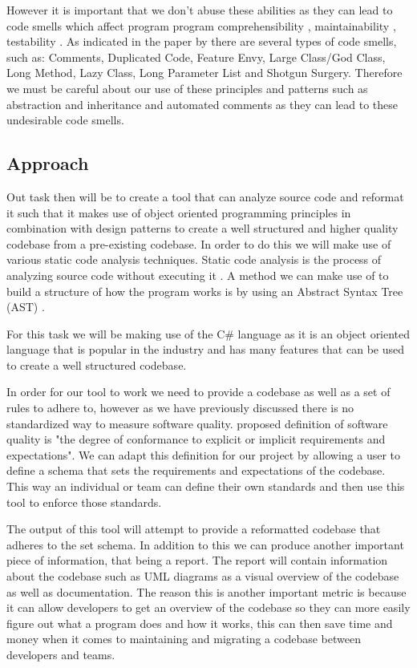 \documentclass{article} %
\begin{document}
However it is important that we don't abuse these abilities as they can lead to code smells which affect program program comprehensibility \citep{8681007, ImpactOfAntipatterns}, maintainability \citep{8681007, ImpactOfAntipatterns2, CodeSmellsAndMaintainability}, testability \citep{8681007, TestCasesAndCodeQuality}. As indicated in the paper by \cite{10.1145/3555228.3555268} there are several types of code smells, such as: Comments, Duplicated Code, Feature Envy, Large Class/God Class, Long Method, Lazy Class, Long Parameter List and Shotgun Surgery. Therefore we must be careful about our use of these principles and patterns such as abstraction and inheritance and automated comments as they can lead to these undesirable code smells.

\subsection{Approach}

Out task then will be to create a tool that can analyze source code and reformat it such that it makes use of object oriented programming principles in combination with design patterns to create a well structured and higher quality codebase from a pre-existing codebase. In order to do this we will make use of various static code analysis techniques. Static code analysis is the process of analyzing source code without executing it \citep{8802820}. A method we can make use of to build a structure of how the program works is by using an Abstract Syntax Tree (AST) \citep{8802820}.

For this task we will be making use of the C\# language as it is an object oriented language that is popular in the industry and has many features that can be used to create a well structured codebase.

In order for our tool to work we need to provide a codebase as well as a set of rules to adhere to, however as we have previously discussed there is no standardized way to measure software quality. \cite{8681007} proposed definition of software quality is "the degree of conformance to explicit or implicit requirements and expectations". We can adapt this definition for our project by allowing a user to define a schema that sets the requirements and expectations of the codebase. This way an individual or team can define their own standards and then use this tool to enforce those standards.

The output of this tool will attempt to provide a reformatted codebase that adheres to the set schema. In addition to this we can produce another important piece of information, that being a report. The report will contain information about the codebase such as UML diagrams as a visual overview of the codebase as well as documentation. The reason this is another important metric is because it can allow developers to get an overview of the codebase so they can more easily figure out what a program does and how it works, this can then save time and money when it comes to maintaining and migrating a codebase between developers and teams.
\end{document}
